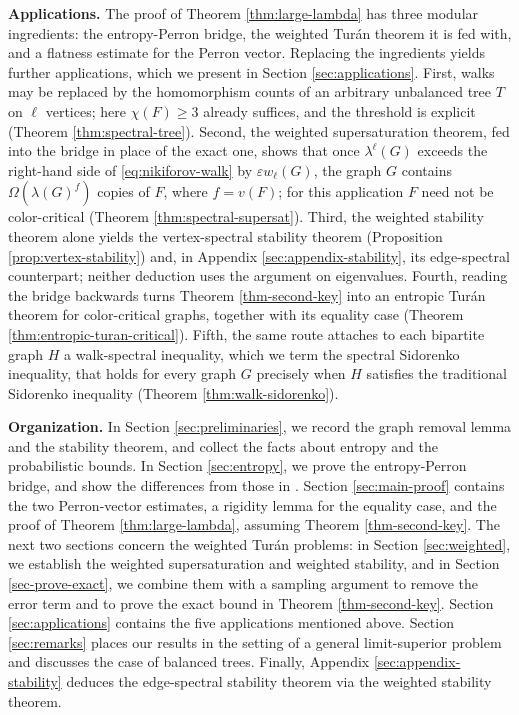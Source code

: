 \documentclass[11pt, a4paper]{article}
\theoremstyle{definition}
\theoremstyle{plain}
\renewcommand{\ge}{\geqslant}
\begin{document}
\medskip
\noindent
{\bf Applications.}
The proof of Theorem \ref{thm:large-lambda} has three modular ingredients: the entropy-Perron bridge, the weighted Tur\'{a}n theorem it is fed with, and a flatness estimate for the Perron vector. 
Replacing the ingredients yields further applications, which we present in Section \ref{sec:applications}. First, walks may be replaced by the homomorphism counts of an arbitrary unbalanced tree $T$ on $\ell$ vertices; here $\chi (F)\ge 3$ already suffices, and the threshold is explicit 
(Theorem \ref{thm:spectral-tree}).
Second, the weighted supersaturation theorem, fed into the bridge in place of the exact one, shows that once $\lambda^{\ell}(G)$ exceeds the right-hand side of \eqref{eq:nikiforov-walk} by $\varepsilon w_\ell (G)$, the graph $G$ contains 
$\Omega (\lambda(G)^{f})$ copies of $F$, 
where $f=v(F)$; 
for this application $F$ need not be color-critical (Theorem \ref{thm:spectral-supersat}). 
Third, the weighted stability theorem alone yields the vertex-spectral stability theorem (Proposition
\ref{prop:vertex-stability}) and, in Appendix
\ref{sec:appendix-stability}, its edge-spectral counterpart; neither deduction uses the argument on eigenvalues.
Fourth, reading the bridge backwards turns Theorem \ref{thm-second-key} into an entropic Tur\'{a}n theorem for color-critical graphs, together with its equality case
(Theorem \ref{thm:entropic-turan-critical}). 
Fifth, the same route attaches to each bipartite graph $H$ a walk-spectral inequality, which we term the spectral Sidorenko inequality, that holds for every graph $G$ precisely when $H$ satisfies the traditional  Sidorenko inequality (Theorem \ref{thm:walk-sidorenko}).




\medskip 
\noindent
{\bf Organization.}
In Section \ref{sec:preliminaries}, we record the graph  removal lemma and the stability theorem, and collect the facts about entropy and the probabilistic bounds. 
In Section \ref{sec:entropy}, we prove the entropy-Perron bridge, and show the differences from those in \cite{CY2026, LSWW2026}.   
Section \ref{sec:main-proof} contains the two Perron-vector estimates, a rigidity lemma for the equality case, and the proof of Theorem \ref{thm:large-lambda}, assuming Theorem \ref{thm-second-key}.  
The next two sections concern the weighted Tur\'{a}n problems:  in Section \ref{sec:weighted},  we
establish the weighted supersaturation and weighted  stability, and in Section \ref{sec-prove-exact}, we combine them with a sampling argument to remove the error term and to prove the exact bound in Theorem \ref{thm-second-key}. 
Section \ref{sec:applications} contains the five applications mentioned above. 
Section \ref{sec:remarks} places our results in the setting of a general limit-superior problem and discusses the case of balanced trees.
Finally, Appendix \ref{sec:appendix-stability} deduces the edge-spectral 
stability theorem via the weighted stability theorem. 
\end{document}
